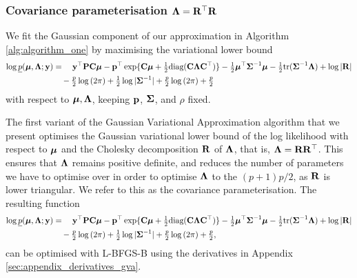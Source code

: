 	\subsubsection{Covariance parameterisation ${\boldsymbol \Lambda} = {\bf R}^\top {\bf R}$}
	
	We fit the Gaussian component of our approximation in Algorithm \ref{alg:algorithm_one} by maximising 
	the variational lower bound	
	\begin{align*}
		\log \underline{p}({\boldsymbol \mu}, {\boldsymbol \Lambda}; {\bf y}) & = \quad {\bf y}^\top{\bf P} {\bf C} {\boldsymbol\mu} - {\bf p}^\top \exp\{{\bf C} {\boldsymbol \mu} + \tfrac{1}{2} \text{diag}({\bf C} {\boldsymbol \Lambda} {\bf C}^\top)\} - \tfrac{1}{2} {\boldsymbol \mu}^\top {\boldsymbol\Sigma}^{-1} {\boldsymbol \mu} - \tfrac{1}{2} \text{tr}{({\boldsymbol\Sigma}^{-1} {\boldsymbol\Lambda})} + \log{|{\bf R}|} \\
		                                        & \quad - \tfrac{p}{2} \log{(2 \pi)} + \tfrac{1}{2} \log{|{\boldsymbol\Sigma}^{-1}|} + \tfrac{p}{2} \log{(2 \pi)} + \tfrac{p}{2}                                                                              
	\end{align*}
	\noindent with respect to ${\boldsymbol \mu}, {\boldsymbol \Lambda}$, keeping ${\bf p}$, ${\boldsymbol \Sigma}$, and $\rho$ fixed.
			
	The first variant of the Gaussian Variational Approximation algorithm that we present optimises the
	Gaussian variational lower bound of the log likelihood with respect to ${\boldsymbol \mu}$ and the Cholesky decomposition
	${\bf R}$ of ${\boldsymbol \Lambda}$, that is, ${\boldsymbol \Lambda} = {\bf R} {\bf R}^\top$. This ensures that ${\boldsymbol \Lambda}$ remains positive
	definite, and reduces the number of parameters we have to optimise over in order to optimise ${\boldsymbol \Lambda}$
	to the $(p + 1) p / 2$, as ${\bf R}$ is lower triangular.	We refer to this as the covariance
	parameterisation. The resulting function
	\begin{align*}
		\log \underline{p}({\boldsymbol \mu}, {\boldsymbol \Lambda}; {\bf y}) & = \quad {\bf y}^\top{\bf P} {\bf C} {\boldsymbol\mu} - {\bf p}^\top \exp\{{\bf C} {\boldsymbol \mu} + \tfrac{1}{2} \text{diag}({\bf C} {\boldsymbol \Lambda} {\bf C}^\top)\} - \tfrac{1}{2} {\boldsymbol \mu}^\top {\boldsymbol\Sigma}^{-1} {\boldsymbol \mu} - \tfrac{1}{2} \text{tr}{({\boldsymbol\Sigma}^{-1} {\boldsymbol\Lambda})} + \log{|{\bf R}|} \\
		                                        & \quad - \tfrac{p}{2} \log{(2 \pi)} + \tfrac{1}{2} \log{|{\boldsymbol\Sigma}^{-1}|} + \tfrac{p}{2} \log{(2 \pi)} + \tfrac{p}{2},                                                                              
	\end{align*}
	can be optimised with L-BFGS-B using the derivatives in Appendix \ref{sec:appendix_derivatives_gva}.
	
